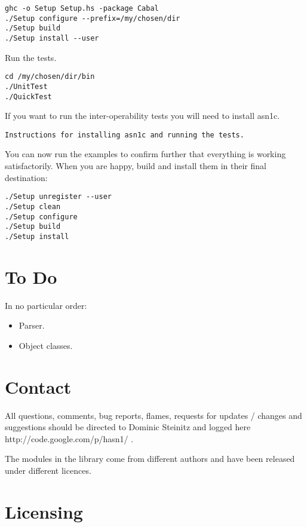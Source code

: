 \documentclass{article}
\begin{document}
\begin{lstlisting}[frame=single]
ghc -o Setup Setup.hs -package Cabal
./Setup configure --prefix=/my/chosen/dir
./Setup build
./Setup install --user
\end{lstlisting}

Run the tests.

\begin{lstlisting}[frame=single]
cd /my/chosen/dir/bin
./UnitTest
./QuickTest
\end{lstlisting}

If you want to run the inter-operability tests you will need to install asn1c.

\begin{lstlisting}[frame=single]
Instructions for installing asn1c and running the tests.
\end{lstlisting}

You can now run the examples to confirm further that everything
is working satisfactorily.
When you are happy, build and install them in
their final destination:

\begin{lstlisting}[frame=single]
./Setup unregister --user
./Setup clean
./Setup configure
./Setup build
./Setup install
\end{lstlisting}

\section{To Do}

In no particular order:

\begin{itemize}
\item
Parser.
\item
Object classes.
\end{itemize}

\section{Contact}

All questions, comments, bug reports, flames, requests for 
updates / changes and suggestions should be directed to Dominic Steinitz and
logged
\htmladdnormallinkfoot
{here}
{http://code.google.com/p/hasn1/}
.


The modules in the library come from different authors and have been 
released under different licences. 

\section{Licensing}
\end{document}

